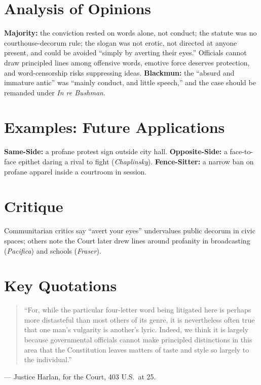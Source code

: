 \documentclass[12pt]{article}
\begin{document}
\section{Analysis of Opinions}
\textbf{Majority:} the conviction rested on words alone, not conduct; the statute was no courthouse-decorum rule; the slogan was not erotic, not directed at anyone present, and could be avoided ``simply by averting their eyes.'' Officials cannot draw principled lines among offensive words, emotive force deserves protection, and word-censorship risks suppressing ideas. \textbf{Blackmun:} the ``absurd and immature antic'' was ``mainly conduct, and little speech,'' and the case should be remanded under \textit{In re Bushman}.

\section{Examples: Future Applications}
\textbf{Same-Side:} a profane protest sign outside city hall. \textbf{Opposite-Side:} a face-to-face epithet daring a rival to fight (\textit{Chaplinsky}). \textbf{Fence-Sitter:} a narrow ban on profane apparel inside a courtroom in session.

\section{Critique}
Communitarian critics say ``avert your eyes'' undervalues public decorum in civic spaces; others note the Court later drew lines around profanity in broadcasting (\textit{Pacifica}) and schools (\textit{Fraser}).

\section{Key Quotations}
\begin{quote}
``For, while the particular four-letter word being litigated here is perhaps more distasteful than most others of its genre, it is nevertheless often true that one man's vulgarity is another's lyric. Indeed, we think it is largely because governmental officials cannot make principled distinctions in this area that the Constitution leaves matters of taste and style so largely to the individual.''
\end{quote}
\noindent --- Justice Harlan, for the Court, 403 U.S.\ at 25.
\end{document}
